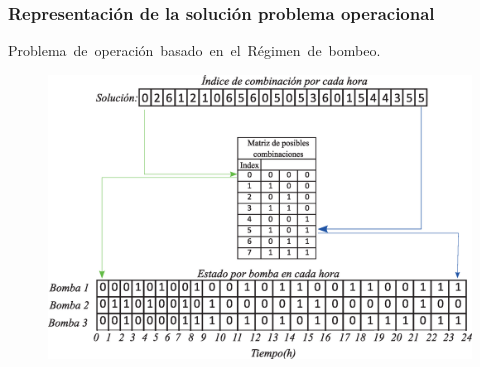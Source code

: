 \documentclass[9pt]{beamer}
\begin{document}
    \begin{frame}
        \frametitle{Representación de la solución problema operacional}
        Problema de operación basado en el Régimen de bombeo.
        \begin{figure}
            \includegraphics[scale=0.3]{assets/Anexo/representacion_solucion_multiobjetivo.eps}
        \end{figure}

    \end{frame}
\end{document}
